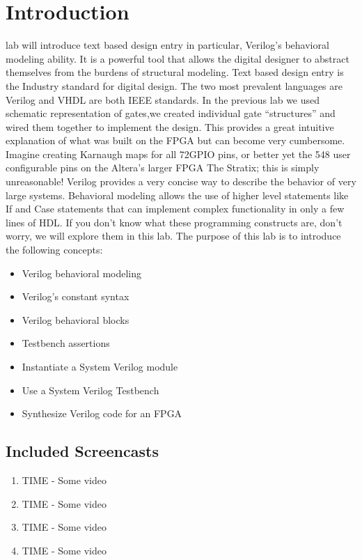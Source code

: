   \section{Introduction}
     lab will introduce text based design entry in particular, Verilog's behavioral modeling ability. It is a powerful tool that allows the digital designer to abstract themselves from the burdens of structural modeling.  Text based design entry is the Industry standard for digital design. The two most prevalent languages are Verilog and VHDL are both IEEE standards. In the previous lab we used schematic representation of gates,we created individual gate ``structures'' and wired them together to implement the design. This provides a great intuitive explanation of what was built on the FPGA but can become very cumbersome.  Imagine creating Karnaugh maps for all 72GPIO pins, or better yet the 548 user configurable pins on the Altera's larger FPGA The Stratix\cite{Altera:StratixVDeviceOverview}; this is simply unreasonable! Verilog provides a very concise way to describe the behavior of very large systems. Behavioral modeling allows the use of higher level statements like If and Case statements that can implement complex functionality in only a few lines of HDL. If you don't know what these programming constructs are, don't worry, we will explore them in this lab. The purpose of this lab is to introduce the following concepts:
    \begin{itemize}
      \item Verilog behavioral modeling
      \item Verilog's constant syntax
      \item Verilog behavioral blocks
      \item Testbench assertions
      \item Instantiate a System Verilog module
      \item Use a System Verilog Testbench
      \item Synthesize Verilog code for an FPGA
    \end{itemize}

    \subsection{Included Screencasts}
      \begin{enumerate}
        \item TIME - Some video
        \item TIME - Some video
        \item TIME - Some video
        \item TIME - Some video
      \end{enumerate}
    

